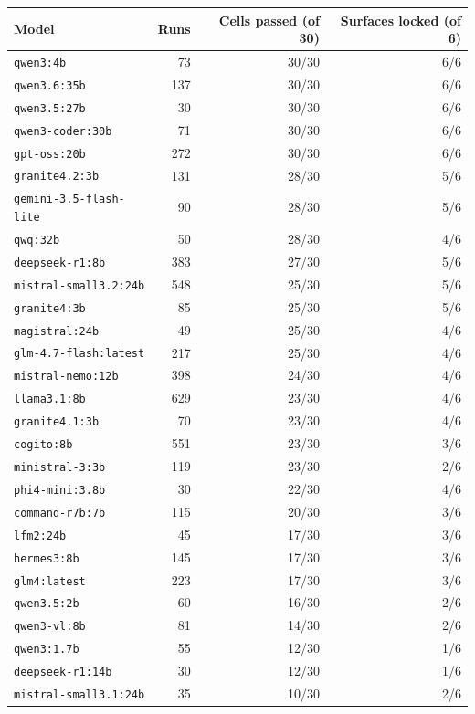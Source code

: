 \documentclass[11pt]{article}
\newcommand{\code}[1]{\texttt{\small #1}}
\begin{document}
\begin{table}[htbp]
\centering\scriptsize
\begin{tabular}{@{}lrrr@{}}
\toprule
Model & Runs & Cells passed (of 30) & Surfaces locked (of 6) \\
\midrule
\code{qwen3:4b} & 73 & 30/30 & 6/6 \\
\code{qwen3.6:35b} & 137 & 30/30 & 6/6 \\
\code{qwen3.5:27b} & 30 & 30/30 & 6/6 \\
\code{qwen3-coder:30b} & 71 & 30/30 & 6/6 \\
\code{gpt-oss:20b} & 272 & 30/30 & 6/6 \\
\code{granite4.2:3b} & 131 & 28/30 & 5/6 \\
\code{gemini-3.5-flash-lite} & 90 & 28/30 & 5/6 \\
\code{qwq:32b} & 50 & 28/30 & 4/6 \\
\code{deepseek-r1:8b} & 383 & 27/30 & 5/6 \\
\code{mistral-small3.2:24b} & 548 & 25/30 & 5/6 \\
\code{granite4:3b} & 85 & 25/30 & 5/6 \\
\code{magistral:24b} & 49 & 25/30 & 4/6 \\
\code{glm-4.7-flash:latest} & 217 & 25/30 & 4/6 \\
\code{mistral-nemo:12b} & 398 & 24/30 & 4/6 \\
\code{llama3.1:8b} & 629 & 23/30 & 4/6 \\
\code{granite4.1:3b} & 70 & 23/30 & 4/6 \\
\code{cogito:8b} & 551 & 23/30 & 3/6 \\
\code{ministral-3:3b} & 119 & 23/30 & 2/6 \\
\code{phi4-mini:3.8b} & 30 & 22/30 & 4/6 \\
\code{command-r7b:7b} & 115 & 20/30 & 3/6 \\
\code{lfm2:24b} & 45 & 17/30 & 3/6 \\
\code{hermes3:8b} & 145 & 17/30 & 3/6 \\
\code{glm4:latest} & 223 & 17/30 & 3/6 \\
\code{qwen3.5:2b} & 60 & 16/30 & 2/6 \\
\code{qwen3-vl:8b} & 81 & 14/30 & 2/6 \\
\code{qwen3:1.7b} & 55 & 12/30 & 1/6 \\
\code{deepseek-r1:14b} & 30 & 12/30 & 1/6 \\
\code{mistral-small3.1:24b} & 35 & 10/30 & 2/6 \\

\end{tabular}
\end{table}
\end{document}
